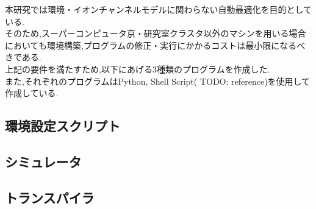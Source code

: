 本研究では環境・イオンチャンネルモデルに関わらない自動最適化を目的としている.\\
そのため,スーパーコンピュータ京・研究室クラスタ以外のマシンを用いる場合においても環境構築,プログラムの修正・実行にかかるコストは最小限になるべきである.\\
上記の要件を満たすため,以下にあげる3種類のプログラムを作成した.\\
また,それぞれのプログラムはPython, Shell Script( TODO: reference)を使用して作成している.\\
\subsection{環境設定スクリプト}


\subsection{シミュレータ}


\subsection{トランスパイラ}

